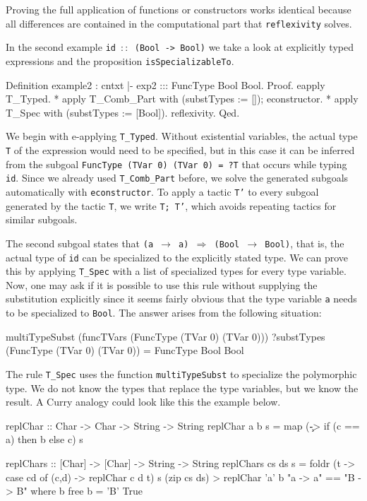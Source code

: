 \documentclass[paper = a4, fleqn, abstract=on, twoside]{scrreprt}
\begin{document}
Proving the full application of functions or constructors works identical because all differences are contained in the computational part that \texttt{reflexivity} solves.\\
\par\noindent
In the second example \texttt{id $::$ (Bool -> Bool)} we take a look at explicitly typed expressions and the proposition \texttt{isSpecializableTo}. 
\begin{coqcode}
Definition example2 : cntxt |- exp2 ::: FuncType Bool Bool.
Proof.
  eapply T_Typed.
    * apply T_Comb_Part with (substTypes := []);
      econstructor.
    * apply T_Spec with (substTypes := [Bool]).
      reflexivity.
Qed.
\end{coqcode}
We begin with e-applying \texttt{T\_Typed}. Without existential variables, the actual type \texttt{T} of the expression would need to be specified, but in this case it can be inferred from the subgoal \texttt{FuncType (TVar 0) (TVar 0) = ?T} that occurs while typing \texttt{id}. Since we already used \texttt{T\_Comb\_Part} before, we solve the generated subgoals automatically with \texttt{econstructor}. To apply a tactic \texttt{T'} to every subgoal generated by the tactic \texttt{T}, we write \texttt{T; T'}, which avoids repeating tactics for similar subgoals. 
\par
The second subgoal states that \texttt{(a $\rightarrow$ a) $\Rightarrow$ (Bool $\rightarrow$ Bool)}, that is, the actual type of \texttt{id} can be specialized to the explicitly stated type. We can prove this by applying \texttt{T\_Spec} with a list of specialized types for every type variable. Now, one may ask if it is possible to use this rule without supplying the substitution explicitly since it seems fairly obvious that the type variable \texttt{a} needs to be specialized to \texttt{Bool}. The answer arises from the following situation:
\begin{coqcode}
multiTypeSubst (funcTVars (FuncType (TVar 0) (TVar 0))) ?substTypes
(FuncType (TVar 0) (TVar 0)) = FuncType Bool Bool
\end{coqcode}
The rule \texttt{T\_Spec} uses the function \texttt{multiTypeSubst} to specialize the polymorphic type. We do not know the types that replace the type variables, but we know the result. A Curry analogy could look like this the example below.
\begin{haskellcode}
replChar :: Char -> Char -> String -> String
replChar a b s = map (\c -> if (c == a) then b else c) s

replChars :: [Char] -> [Char] -> String -> String
replChars cs ds s =  foldr (\cd t -> case cd of (c,d) -> replChar c d t)
                           s (zip cs ds)
> replChar 'a' b "a -> a" == "B -> B" where b free
{b = 'B'} True
\end{haskellcode}
\end{document}
